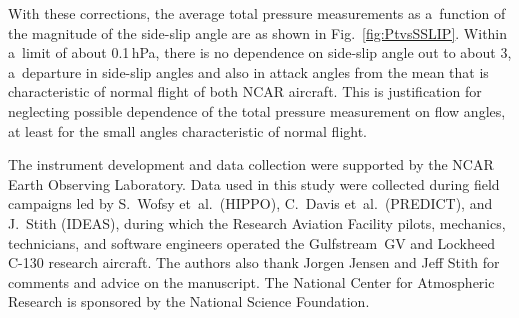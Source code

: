 \documentclass[amtd, online, hvmath]{copernicus}
\begin{document}
With these corrections, the average total pressure measurements as
a~function of the magnitude of the side-slip angle are as shown in
Fig.~\ref{fig:PtvsSSLIP}. Within a~limit of about 0.1\,hPa, there is
no dependence on side-slip angle out to about 3{\degree}, a~departure
in side-slip angles and also in attack angles from the mean that is
characteristic of normal flight of both NCAR aircraft. This is
justification for neglecting possible dependence of the total pressure
measurement on flow angles, at least for the small angles
characteristic of normal flight.

\begin{acknowledgements}
  The instrument development and data collection were supported by the
  NCAR Earth Observing Laboratory. Data used in this study were
  collected during field campaigns led by S.~Wofsy et~al.~(HIPPO),
  C.~Davis et~al.~(PREDICT), and J.~Stith (IDEAS), during which the
  Research Aviation Facility pilots, mechanics, technicians, and
  software engineers operated the Gulfstream~GV and Lockheed C-130
  research aircraft.  The authors also thank Jorgen Jensen and Jeff
  Stith for comments and advice on the manuscript. The National Center
  for Atmospheric Research is sponsored by the National Science
  Foundation.
\end{acknowledgements}
\end{document}
